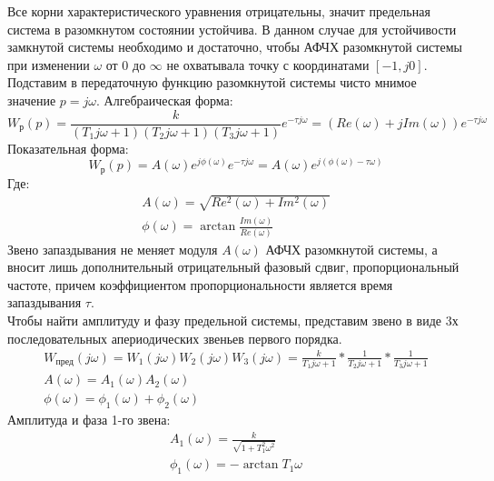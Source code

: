 \documentclass[12pt]{article}
\begin{document}
Все корни характеристического уравнения отрицательны, значит предельная система в разомкнутом состоянии устойчива. В данном случае для устойчивости замкнутой системы необходимо и достаточно, чтобы АФЧХ разомкнутой системы при изменении $\omega$ от 0 до $\infty$ не охватывала точку с координатами $[-1, j0]$. \\
Подставим в передаточную функцию разомкнутой системы чисто мнимое значение $p = j\omega$. Алгебраическая форма: 
\begin{equation}
    W_р(p) = \frac{k}{(T_1j\omega + 1)(T_2j\omega + 1)(T_3j\omega + 1)}e^{-\tau j\omega} = (Re(\omega) + jIm(\omega))e^{-\tau j\omega}
\end{equation}
Показательная форма: 
\begin{equation}
    W_р(p) = A(\omega)e^{j\phi(\omega)}e^{-\tau j\omega} = A(\omega)e^{j(\phi(\omega)-\tau \omega)} 
\end{equation}
Где: 
\begin{equation}
    \begin{gathered}
        A(\omega) = \sqrt{Re^2(\omega) + Im^2(\omega)}\\
        \phi(\omega) =\arctan{\frac{Im(\omega)}{Re(\omega)}} 
    \end{gathered}
\end{equation}
Звено запаздывания не меняет модуля $A(\omega)$ АФЧХ разомкнутой системы, а вносит лишь дополнительный отрицательный фазовый сдвиг, пропорциональный частоте, причем коэффициентом пропорциональности является время запаздывания $\tau$. \\
Чтобы найти амплитуду и фазу предельной системы, представим звено в виде 3х последовательных апериодических звеньев первого порядка. 
\begin{equation}
    \begin{gathered}
    W_{пред}(j\omega) = W_1(j\omega)W_2(j\omega)W_3(j\omega) = \frac{k}{T_1j\omega + 1}*\frac{1}{T_2j\omega + 1}*\frac{1}{T_3j\omega + 1} \\
    A(\omega) = A_1(\omega)A_2(\omega) \\
    \phi(\omega) = \phi_1(\omega) + \phi_2(\omega)
    \end{gathered}
\end{equation}
Амплитуда и фаза 1-го звена: 
\begin{equation}
    \begin{gathered}
    A_1(\omega) = \frac{k}{\sqrt{1 + T_1^2\omega^2}} \\
    \phi_1(\omega) = -\arctan{T_1\omega}
    \end{gathered}
\end{equation}
\end{document}

